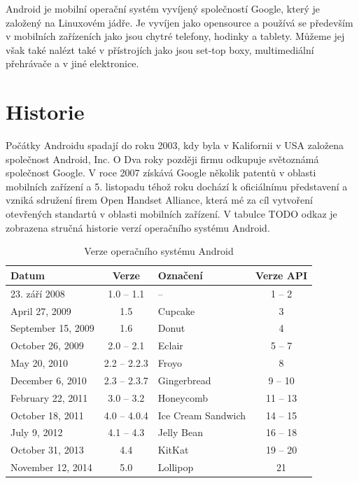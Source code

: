 Android je mobilní operační systém vyvíjený společností Google, který je založený na Linuxovém jádře. Je vyvíjen jako opensource a používá se především v mobilních zařízeních jako jsou chytré telefony, hodinky a tablety. Můžeme jej však také nalézt také v přístrojích jako jsou set-top boxy, multimediální přehrávače a v jiné elektronice.\\
\section{Historie}
Počátky Androidu spadají do roku 2003, kdy byla v Kalifornii v USA založena společnost Android, Inc. O Dva roky později firmu odkupuje světoznámá společnost Google. V roce 2007 získává Google několik patentů v oblasti mobilních zařízení a 5. listopadu téhož roku dochází k oficiálnímu představení a vzniká sdružení firem Open Handset Alliance, která mé za cíl vytvoření otevřených standartů v oblasti mobilních zařízení. V tabulce TODO odkaz je zobrazena stručná historie verzí operačního systému Android.

\begin {table}[h!]
\begin{tabular}{|l|c|l|c|}
\hline
{\bf Datum}         & {\bf Verze}   & {\bf Označení}        & {\bf Verze API}   \\
\hline \hline
23. září 2008       & 1.0 -- 1.1    & --                    & 1 -- 2            \\
\hline
April 27, 2009      & 1.5           & Cupcake               & 3                 \\
\hline
September 15, 2009  & 1.6           & Donut                 & 4                 \\
\hline
October 26, 2009    & 2.0 -- 2.1    & Eclair                & 5 -- 7            \\
\hline
May 20, 2010        & 2.2 -- 2.2.3  & Froyo                 & 8                 \\
\hline
December 6, 2010    & 2.3 -- 2.3.7  & Gingerbread           & 9 -- 10           \\
\hline
February 22, 2011   & 3.0 -- 3.2    & Honeycomb             & 11 -- 13          \\
\hline
October 18, 2011    & 4.0 -- 4.0.4  & Ice Cream Sandwich    & 14 -- 15          \\
\hline
July 9, 2012        & 4.1 -- 4.3    & Jelly Bean            & 16 -- 18          \\
\hline
October 31, 2013    & 4.4           & KitKat                & 19 -- 20          \\
\hline
November 12, 2014   & 5.0           & Lollipop              & 21                \\
\hline
\end{tabular}
\centering
\caption{Verze operačního systému Android}
\end{table}

